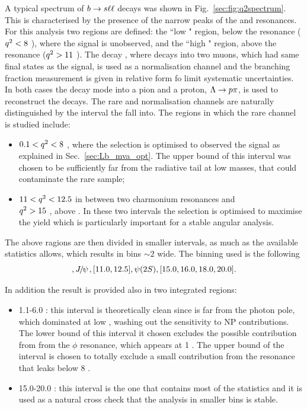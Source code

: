 A typical \qsq spectrum of ${b}\rightarrow{\ensuremath{s}}\ell\ell$ decays was shown in Fig.~\ref{sec:fig:q2spectrum}.
This is characterised by the presence of the narrow peaks of the \jpsi and \psitwos resonances.
For this analysis two regions are defined: the ``low \qsq" region, below the \jpsi resonance (${q^2} < 8$ \gevgevcccc),
where the signal is unobserved, and the ``high \qsq" region, above the \jpsi resonance (${q^2} > 11$ \gevgevcccc).
The decay \Lb\to\jpsi\Lz, where \jpsi decays into two muons, which had same final states as the signal,
is used as a normalisation channel and the branching fraction measurement is given in relative form
fo limit systematic uncertainties. In both cases the \Lz decay mode into a pion and a proton, $\Lz\to p\pi$,
is used to reconstruct the decays. The rare and normalisation channels are naturally distinguished
by the \qsq interval the fall into. The regions in which the rare channel is studied include:
\begin{itemize}
\item $0.1 < {q^2} < 8$ \gevgevcccc, where the selection is optimised to observed the signal as explained in Sec.~\ref{sec:Lb_mva_opt}.
The upper bound of this interval was chosen to be sufficiently far from the \jpsi radiative tail at low masses, that
could contaminate the rare sample;
\item  $11 < {q^2} < 12.5$ \gevgevcccc in between two charmonium resonances and \\${q^2}>15$ \gevgevcccc, above \psitwos.
In these two intervals the selection is optimised to maximise the yield which is particularly important
for a stable angular analysis.
\end{itemize}
The above ragions are then divided in smaller intervals, as much as the available statistics allows, which results
in bins $\sim 2$ \gevgevcccc wide. The binning used is the following 
\begin{equation}
[0.1, 2.0, 4.0, 6.0, 8.0], \jpsi, [11.0, 12.5], \psitwos, [15.0, 16.0, 18.0, 20.0].
\end{equation}

In addition the result is provided also in two integrated regions:
\begin{itemize}
\item 1.1-6.0 \gevgevcccc: this interval is theoretically clean since is far from the
photon pole, which dominated at low \qsq, washing out the sensitivity to NP contributions.
The lower bound of this interval it chosen excludes the possible contribution from
from the $\phi$ resonance, which appears at 1 \gevgevcccc. The upper bound of the interval
is chosen to totally exclude a small contribution from the \jpsi resonance that leaks
below 8 \gevgevcccc.
\item 15.0-20.0 \gevgevcccc: this interval is the one that contains most of the
statistics and it is used as a natural cross check that the analysis in smaller bins is stable.
\end{itemize}


